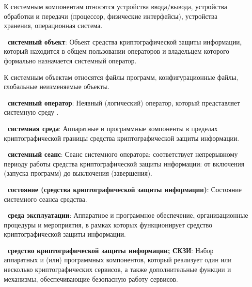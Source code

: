 \begin{note}
К системным компонентам относятся
устройства ввода/вывода,
устройства обработки и передачи (процессор, физические интерфейсы),
устройства хранения,
операционная система.
\end{note}

{\bf \thedefctr~системный объект}: 
Объект средства криптографической защиты информации, 
который находится в общем пользовании операторов 
и владельцем которого формально назначается системный оператор.


\begin{note}
К  системным объектам относятся файлы программ, 
конфигурационные файлы, глобальные неизменяемые объекты.
%
\end{note}

{\bf \thedefctr~системный оператор}:
Неявный (логический) оператор, который представляет системную среду
.

{\bf \thedefctr~системная среда}:
Аппаратные и программные компоненты в пределах криптографической границы
средства криптографической защиты информации.

{\bf \thedefctr~системный сеанс}:
Сеанс системного оператора; соответствует непрерывному периоду работы 
средства криптографической защиты информации: от включения (запуска программ) 
до выключения (завершения).


{\bf \thedefctr~состояние (средства криптографической защиты информации)}:
Состояние системного сеанса средства.

{\bf \thedefctr~среда эксплуатации}:
Аппаратное и программное обеспечение, организационные процедуры и 
мероприятия, в рамках которых функционирует средство криптографической защиты 
информации.

{\bf \thedefctr~средство криптографической защиты информации; СКЗИ}:
Набор аппаратных и (или) программных компонентов, который реализует один или 
несколько криптографических сервисов, а также дополнительные функции и 
механизмы, обеспечивающие безопасную работу сервисов.

